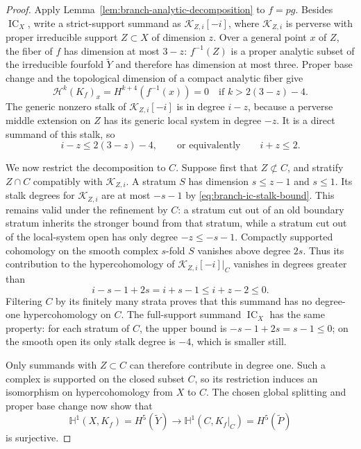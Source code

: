 \documentclass[11pt]{amsart}
\theoremstyle{definition}
\theoremstyle{remark}
\numberwithin{equation}{section}
\DeclareMathOperator{\IC}{IC}
\begin{document}
\begin{proof}
Apply Lemma~\ref{lem:branch-analytic-decomposition} to $f=pg$.
Besides $\IC_X$, write a strict-support summand as
$\mathcal K_{Z,i}[-i]$, where $\mathcal K_{Z,i}$ is perverse with
proper irreducible support $Z\subset X$ of dimension $z$.  Over a
general point $x$ of $Z$, the fiber of $f$ has dimension at most $3-z$:
$f^{-1}(Z)$ is a proper analytic subset of the irreducible fourfold
$\widetilde Y$ and therefore has dimension at most three.  Proper base
change and the topological dimension of a compact analytic fiber give
\[
 \mathcal H^k(K_f)_x=H^{k+4}(f^{-1}(x))=0
               \quad\text{if }k>2(3-z)-4.
\]
The generic nonzero stalk of $\mathcal K_{Z,i}[-i]$ is in degree
$i-z$, because a perverse middle extension on $Z$ has its generic
local system in degree $-z$.  It is a direct summand of this stalk,
so
\begin{equation}\label{eq:branch-support-shift}
 i-z\leq2(3-z)-4,\qquad\text{or equivalently}\qquad i+z\leq2.
\end{equation}

We now restrict the decomposition to $C$.  Suppose first that
$Z\not\subset C$, and stratify $Z\cap C$ compatibly with
$\mathcal K_{Z,i}$.  A stratum $S$ has dimension $s\leq z-1$ and
$s\leq1$.  Its stalk degrees for $\mathcal K_{Z,i}$ are at most
$-s-1$ by \eqref{eq:branch-ic-stalk-bound}.  This remains valid under
the refinement by $C$: a stratum cut out of an old boundary stratum
inherits the stronger bound from that stratum, while a stratum cut
out of the local-system open has only degree $-z\leq-s-1$.
Compactly supported cohomology on the smooth complex $s$-fold $S$
vanishes above degree $2s$.  Thus its contribution to the
hypercohomology of $\mathcal K_{Z,i}[-i]|_C$ vanishes in degrees
greater than
\[
 i-s-1+2s=i+s-1\leq i+z-2\leq0.
\]
Filtering $C$ by its finitely many strata proves that this summand
has no degree-one hypercohomology on $C$.  The full-support summand
$\IC_X$ has the same property: for each stratum of $C$, the upper
bound is $-s-1+2s=s-1\leq0$; on the smooth open its only stalk degree
is $-4$, which is smaller still.

Only summands with $Z\subset C$ can therefore contribute in degree
one.  Such a complex is supported on the closed subset $C$, so its
restriction induces an isomorphism on hypercohomology from $X$ to
$C$.  The chosen global splitting and proper base change now show that
\[
 \mathbb H^1(X,K_f)=H^5(\widetilde Y)
   \longrightarrow
 \mathbb H^1(C,K_f|_C)=H^5(\widetilde P)
\]
is surjective.


\end{proof}
\end{document}
